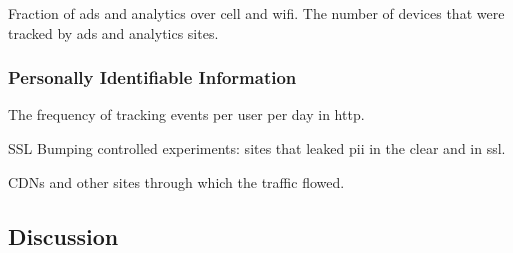 Fraction of ads and analytics over cell and wifi. 
The number of devices that were tracked by ads and analytics sites.

\subsubsection{Personally Identifiable Information}

The frequency of tracking events per user per day in http.

SSL Bumping controlled experiments: sites that leaked pii in the clear and in ssl.

CDNs and other sites through which the traffic flowed.

\subsection{Discussion}











